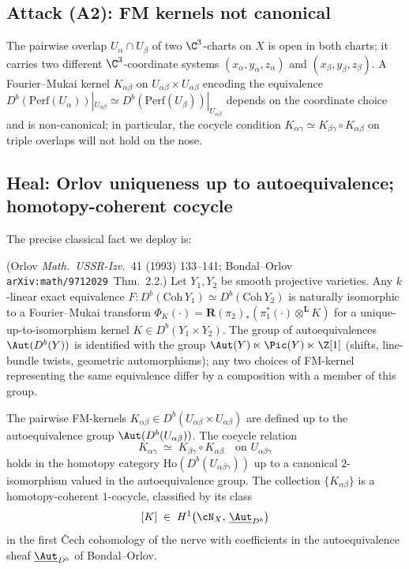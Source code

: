 \subsection*{Attack (A2): FM kernels not canonical}

The pairwise overlap $U_\alpha \cap U_\beta$ of two $\C^3$-charts on
$X$ is open in both charts; it carries two different $\C^3$-coordinate
systems $(x_\alpha, y_\alpha, z_\alpha)$ and
$(x_\beta, y_\beta, z_\beta)$. A Fourier--Mukai kernel $K_{\alpha\beta}$
on $U_{\alpha\beta} \times U_{\alpha\beta}$ encoding the equivalence
$D^b(\mathrm{Perf}(U_\alpha))|_{U_{\alpha\beta}} \simeq
D^b(\mathrm{Perf}(U_\beta))|_{U_{\alpha\beta}}$ depends on the
coordinate choice and is non-canonical; in particular, the cocycle
condition
$K_{\alpha\gamma} \simeq K_{\beta\gamma} \circ K_{\alpha\beta}$ on
triple overlaps will not hold on the nose.

\subsection*{Heal: Orlov uniqueness up to autoequivalence; homotopy-coherent cocycle}

The precise classical fact we deploy is:

\begin{theorem}
\label{thm:orlov-uniqueness}
\textup{(Orlov \emph{Math.~USSR-Izv.~}41 (1993) 133--141; Bondal--Orlov
\texttt{arXiv:math/9712029}~Thm.~2.2.)}
Let $Y_1, Y_2$ be smooth projective varieties. Any $k$-linear exact
equivalence $F: D^b(\mathrm{Coh}\,Y_1) \simeq D^b(\mathrm{Coh}\,Y_2)$
is naturally isomorphic to a Fourier--Mukai transform
$\Phi_{K}(\cdot) = \mathbf{R}(\pi_2)_\ast(\pi_1^\ast(\cdot)
\otimes^\mathbf{L} K)$ for a unique-up-to-isomorphism kernel
$K \in D^b(Y_1 \times Y_2)$. The group of autoequivalences
$\Aut(D^b(Y))$ is identified with the group $\Aut(Y) \ltimes
\Pic(Y) \ltimes \Z[1]$ (shifts, line-bundle twists, geometric
automorphisms); any two choices of FM-kernel representing the same
equivalence differ by a composition with a member of this group.
\end{theorem}

\begin{corollary}
\label{cor:homotopy-cocycle}
The pairwise FM-kernels $K_{\alpha\beta} \in D^b(U_{\alpha\beta}
\times U_{\alpha\beta})$ are defined up to the autoequivalence group
$\Aut(D^b(U_{\alpha\beta}))$. The cocycle relation
\[
  K_{\alpha\gamma} \;\simeq\; K_{\beta\gamma} \circ K_{\alpha\beta}
  \quad \text{on } U_{\alpha\beta\gamma}
\]
holds in the homotopy category
$\mathrm{Ho}(D^b(U_{\alpha\beta\gamma}))$ up to a canonical
$2$-isomorphism valued in the autoequivalence group. The collection
$\{K_{\alpha\beta}\}$ is a homotopy-coherent $1$-cocycle, classified
by its class
\[
  [K] \;\in\; H^1\bigl(\cN_X, \, \underline{\Aut}_{D^b}\bigr)
\]
in the first Čech cohomology of the nerve with coefficients in the
autoequivalence sheaf $\underline{\Aut}_{D^b}$ of Bondal--Orlov.
\end{corollary}

